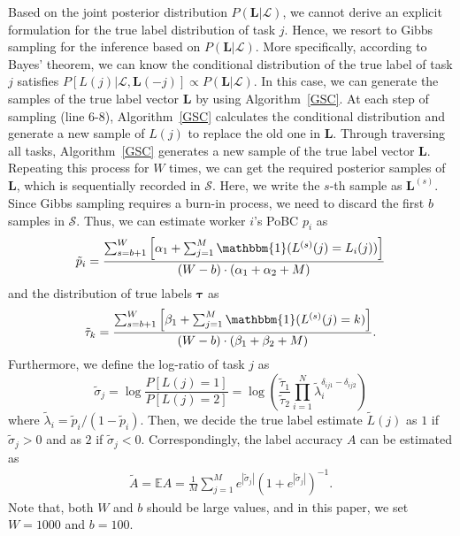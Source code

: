 \documentclass{article}
\begin{document}
Based on the joint posterior distribution $P(\bm{L}|\mathcal{L})$, we cannot derive an explicit formulation for the true label distribution of task $j$. Hence, we resort to Gibbs sampling for the inference based on $P(\bm{L}|\mathcal{L})$.
More specifically, according to Bayes' theorem, we can know the conditional distribution of the true label of task $j$ satisfies
$P[L(j)|\mathcal{L}, \bm{L}(-j)]\propto P(\bm{L}|\mathcal{L})$.
In this case, we can generate the samples of the true label vector $\bm{L}$ by using Algorithm~\ref{GSC}.
At each step of sampling (line 6-8), Algorithm~\ref{GSC} calculates the conditional distribution and generate a new sample of $L(j)$ to replace the old one in $\bm{L}$.
Through traversing all tasks, Algorithm~\ref{GSC} generates a new sample of the true label vector $\bm{L}$.
Repeating this process for $W$ times, we can get the required posterior samples of $\bm{L}$, which is sequentially recorded in $\mathcal{S}$.
Here, we write the $s$-th sample as $\bm{L}^{(s)}$.
Since Gibbs sampling requires a burn-in process, we need to discard the first $b$ samples in $\mathcal{S}$.
Thus, we can estimate worker $i$'s PoBC $p_i$ as
\begin{equation}
\label{p_infer}
\tilde{p}_{i}=\frac{\sum_{s=b+1}^{W}\left[\alpha_{1}+\sum_{j=1}^{M}\mathbbm{1}(L^{(s)}(j)=L_{i}(j))\right]}{(W-b)\cdot(\alpha_{1}+\alpha_{2}+M)}
\end{equation}
and the distribution of true labels $\bm{\tau}$ as
\begin{equation}
\label{tau_infer}
\tilde{\tau}_{k}=\frac{\sum_{s=b+1}^{W}\left[\beta_{1}+\sum_{j=1}^{M}\mathbbm{1}(L^{(s)}(j)=k)\right]}{(W-b)\cdot(\beta_{1}+\beta_{2}+M)}.
\end{equation}
Furthermore, we define the log-ratio of task $j$ as
\begin{equation}
\label{ProbRatio}
\tilde{\sigma}_j=\log\frac{P[L(j)=1]}{P[L(j)=2]}=\log\left(\frac{\tilde{\tau}_1}{\tilde{\tau}_2}\prod_{i=1}^{N}\tilde{\lambda}_i^{\delta_{ij1}-\delta_{ij2}}\right)
\end{equation}
where $\tilde{\lambda}_i = \tilde{p}_i/(1-\tilde{p}_i)$.
Then, we decide the true label estimate $\tilde{L}(j)$ as $1$ if $\tilde{\sigma}_j>0$ and as $2$ if $\tilde{\sigma}_j<0$.
Correspondingly, the label accuracy $A$ can be estimated as
\begin{equation}
\label{vot}
\begin{split}
\tilde{A}=\mathbb{E}A = \frac{1}{M}{\sum}_{j=1}^{M}e^{|\tilde{\sigma}_j|}\left(1+e^{|\tilde{\sigma}_j|}\right)^{-1}.
\end{split}
\end{equation}
Note that, both $W$ and $b$ should be large values, and in this paper, we set $W=1000$ and $b=100$.
\end{document}
